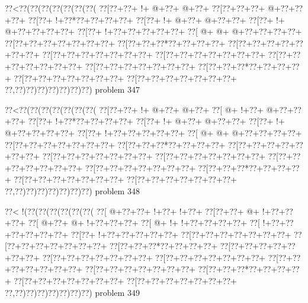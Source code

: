 \vbox{\vbox{\goo
\0??<\0??(\0??(\0??(\0??(\0??(\0??(\0??(
\0??[\0??+\0??+\- !+\- @+\0??+\- @+\0??+
\0??[\0??+\0??+\0??+\- @+\0??+\0??+\0??+
\0??[\0??+\- !+\0??*\0??+\0??+\0??+\0??+
\0??[\0??+\- !+\- @+\0??+\- @+\0??+\0??+
\0??[\0??+\- !+\- @+\0??+\0??+\0??+\0??+
\0??[\0??+\- !+\0??+\0??+\0??+\0??+\0??+
\0??[\- @+\- @+\- @+\0??+\0??+\0??+\0??+
\0??[\0??+\0??+\0??+\0??+\0??+\0??+\0??+
\0??[\0??+\0??+\0??*\0??+\0??+\0??+\0??+
\0??[\0??+\0??+\0??+\0??+\0??+\0??+\0??+
\0??[\0??+\0??+\0??+\0??+\0??+\0??+\0??+
\0??[\0??+\0??+\0??+\0??+\0??+\0??+\0??+
\0??[\0??+\0??+\0??+\0??+\0??+\0??+\0??+
\0??[\0??+\0??+\0??+\0??+\0??+\0??+\0??+
\0??[\0??+\0??+\0??*\0??+\0??+\0??+\0??+
\0??[\0??+\0??+\0??+\0??+\0??+\0??+\0??+
\0??[\0??+\0??+\0??+\0??+\0??+\0??+\0??+
\0??,\0??)\0??)\0??)\0??)\0??)\0??)\0??)
}
\hfil problem 347\hfil\break
}

\vbox{\vbox{\goo
\0??<\0??(\0??(\0??(\0??(\0??(\0??(\0??(
\0??[\0??+\0??+\- !+\- @+\0??+\- @+\0??+
\0??[\- @+\- !+\0??+\- @+\0??+\0??+\0??+
\0??[\0??+\- !+\0??*\0??+\0??+\0??+\0??+
\0??[\0??+\- !+\- @+\0??+\- @+\0??+\0??+
\0??[\0??+\- !+\- @+\0??+\0??+\0??+\0??+
\0??[\0??+\- !+\0??+\0??+\0??+\0??+\0??+
\0??[\- @+\- @+\- @+\0??+\0??+\0??+\0??+
\0??[\0??+\0??+\0??+\0??+\0??+\0??+\0??+
\0??[\0??+\0??+\0??*\0??+\0??+\0??+\0??+
\0??[\0??+\0??+\0??+\0??+\0??+\0??+\0??+
\0??[\0??+\0??+\0??+\0??+\0??+\0??+\0??+
\0??[\0??+\0??+\0??+\0??+\0??+\0??+\0??+
\0??[\0??+\0??+\0??+\0??+\0??+\0??+\0??+
\0??[\0??+\0??+\0??+\0??+\0??+\0??+\0??+
\0??[\0??+\0??+\0??*\0??+\0??+\0??+\0??+
\0??[\0??+\0??+\0??+\0??+\0??+\0??+\0??+
\0??[\0??+\0??+\0??+\0??+\0??+\0??+\0??+
\0??,\0??)\0??)\0??)\0??)\0??)\0??)\0??)
}
\hfil problem 348\hfil\break
}

\vbox{\vbox{\goo
\0??<\- !(\0??(\0??(\0??(\0??(\0??(\0??(
\0??[\- @+\0??+\0??+\- !+\0??+\- !+\0??+
\0??[\0??+\0??+\- @+\- !+\0??+\0??+\0??+
\0??[\- @+\0??+\- @+\- !+\0??+\0??+\0??+
\0??[\- @+\- !+\- !+\0??+\0??+\0??+\0??+
\0??[\- !+\0??+\0??+\0??+\0??+\0??+\0??+
\0??[\0??+\- !+\0??+\0??+\0??+\0??+\0??+
\0??[\0??+\0??+\0??+\0??+\0??+\0??+\0??+
\0??[\0??+\0??+\0??+\0??+\0??+\0??+\0??+
\0??[\0??+\0??+\0??*\0??+\0??+\0??+\0??+
\0??[\0??+\0??+\0??+\0??+\0??+\0??+\0??+
\0??[\0??+\0??+\0??+\0??+\0??+\0??+\0??+
\0??[\0??+\0??+\0??+\0??+\0??+\0??+\0??+
\0??[\0??+\0??+\0??+\0??+\0??+\0??+\0??+
\0??[\0??+\0??+\0??+\0??+\0??+\0??+\0??+
\0??[\0??+\0??+\0??*\0??+\0??+\0??+\0??+
\0??[\0??+\0??+\0??+\0??+\0??+\0??+\0??+
\0??[\0??+\0??+\0??+\0??+\0??+\0??+\0??+
\0??,\0??)\0??)\0??)\0??)\0??)\0??)\0??)
}
\hfil problem 349\hfil\break
}

